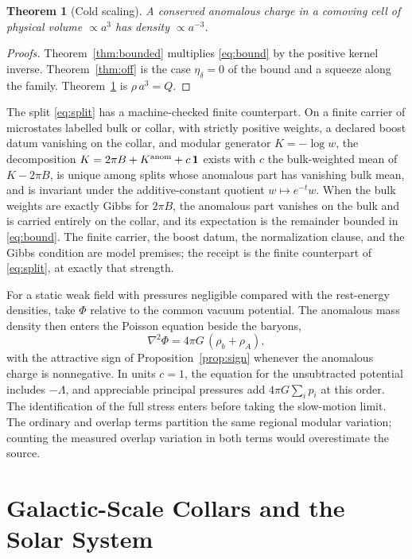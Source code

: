 \documentclass[11pt]{article}
\newtheorem{theorem}{Theorem}[section]
\begin{document}
\begin{theorem}[Cold scaling]
\label{thm:cold}
A conserved anomalous charge in a comoving cell of physical volume
\(\propto a^3\) has density \(\propto a^{-3}\).
\end{theorem}

\begin{proof}[Proofs]
Theorem~\ref{thm:bounded} multiplies \eqref{eq:bound} by the positive kernel
inverse. Theorem~\ref{thm:off} is the case \(\eta_\delta=0\) of the bound and
a squeeze along the family. Theorem~\ref{thm:cold} is
\(\rho\,a^3=Q\).
\end{proof}

The split \eqref{eq:split} has a machine-checked finite counterpart. On a
finite carrier of microstates labelled bulk or collar, with strictly
positive weights, a declared boost datum vanishing on the collar, and
modular generator \(K=-\log w\), the decomposition
\(K=2\pi B+K^{\rm anom}+c\,\mathbf 1\) exists with \(c\) the bulk-weighted
mean of \(K-2\pi B\), is unique among splits whose anomalous part has
vanishing bulk mean, and is invariant under the additive-constant
quotient \(w\mapsto e^{-t}w\). When the bulk weights are exactly Gibbs for
\(2\pi B\), the anomalous part vanishes on the bulk and is carried
entirely on the collar, and its expectation is the remainder bounded in
\eqref{eq:bound}. The finite carrier, the boost datum, the normalization
clause, and the Gibbs condition are model premises; the receipt is the
finite counterpart of \eqref{eq:split}, at exactly that strength.

For a static weak field with pressures negligible compared with the
rest-energy densities, take $\Phi$ relative to the common vacuum
potential. The anomalous mass density then enters the Poisson equation
beside the baryons,
\begin{equation}
\nabla^2\Phi=4\pi G\,(\rho_b+\rho_A),
\label{eq:poisson}
\end{equation}
with the attractive sign of Proposition~\ref{prop:sign} whenever the
anomalous charge is nonnegative. In units $c=1$, the equation for the
unsubtracted potential includes $-\Lambda$, and appreciable principal
pressures add $4\pi G\sum_i p_i$ at this order. The identification
of the full stress enters before taking the slow-motion limit.
The ordinary and overlap terms partition the same regional modular
variation; counting the measured overlap variation in both terms would
overestimate the source.

\section{Galactic-Scale Collars and the Solar System}
\label{sec:solar}
\end{document}
